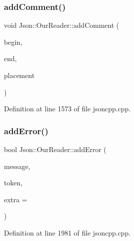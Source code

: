 \subsubsection{\texorpdfstring{add\+Comment()}{addComment()}}
{\footnotesize\ttfamily void Json\+::\+Our\+Reader\+::add\+Comment (\begin{DoxyParamCaption}\item[{\hyperlink{class_json_1_1_our_reader_a1bdc7bbc52ba87cae6b19746f2ee0189}{Location}}]{begin,  }\item[{\hyperlink{class_json_1_1_our_reader_a1bdc7bbc52ba87cae6b19746f2ee0189}{Location}}]{end,  }\item[{\hyperlink{namespace_json_a4fc417c23905b2ae9e2c47d197a45351}{Comment\+Placement}}]{placement }\end{DoxyParamCaption})\hspace{0.3cm}{\ttfamily [private]}}



Definition at line 1573 of file jsoncpp.\+cpp.

\hypertarget{class_json_1_1_our_reader_aa6a920311e6408ff3a45324d49da18a6}{}\label{class_json_1_1_our_reader_aa6a920311e6408ff3a45324d49da18a6} 
\subsubsection{\texorpdfstring{add\+Error()}{addError()}}
{\footnotesize\ttfamily bool Json\+::\+Our\+Reader\+::add\+Error (\begin{DoxyParamCaption}\item[{const \hyperlink{config_8h_a1e723f95759de062585bc4a8fd3fa4be}{J\+S\+O\+N\+C\+P\+P\+\_\+\+S\+T\+R\+I\+NG} \&}]{message,  }\item[{\hyperlink{class_json_1_1_our_reader_1_1_token}{Token} \&}]{token,  }\item[{\hyperlink{class_json_1_1_our_reader_a1bdc7bbc52ba87cae6b19746f2ee0189}{Location}}]{extra = {} }\end{DoxyParamCaption})\hspace{0.3cm}{\ttfamily [private]}}



Definition at line 1981 of file jsoncpp.\+cpp.

\hypertarget{class_json_1_1_our_reader_a074cf3d91e9404fe89e03cfc6a43e6fb}{}\label{class_json_1_1_our_reader_a074cf3d91e9404fe89e03cfc6a43e6fb} 
